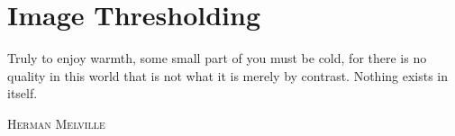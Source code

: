 \newcommand{\thresholdFigure}[4]
{
\begin{figure}
    \begin{subfigure}[b]{\basicWidth}
		\texttt{[image: ImageThresholding/img/\#1\_img.png]}
    \end{subfigure}%
    ~
    \begin{subfigure}[b]{\basicWidth}
		\begin{tikzpicture}
		\begin{axis}[
		ybar interval,
		scaled y ticks = false,
		xtick=\empty,
		extra x ticks       = #2,
		extra x tick style  = { grid = major },
		yticklabels={,,},
		scale only axis,
		width=\linewidth,
		height=0.68\linewidth,
		enlargelimits=false
		]

		\addplot+[hist={data=y,bins=64}]
		table[x=Index,y=Value] {ImageThresholding/img/#1_pixels.values};

		\end{axis}
		\end{tikzpicture}
    \end{subfigure}
    \caption{#3}
    \label{fig:#4}
\end{figure}
}

\chapter{Image Thresholding} 
\label{chap:ImageThresholding}

\epigraph{Truly to enjoy warmth, some small part of you must be cold, for there is no quality in this world that is not what it is merely by contrast. Nothing exists in itself.}
{\textsc{Herman Melville}}

\pagebreak





